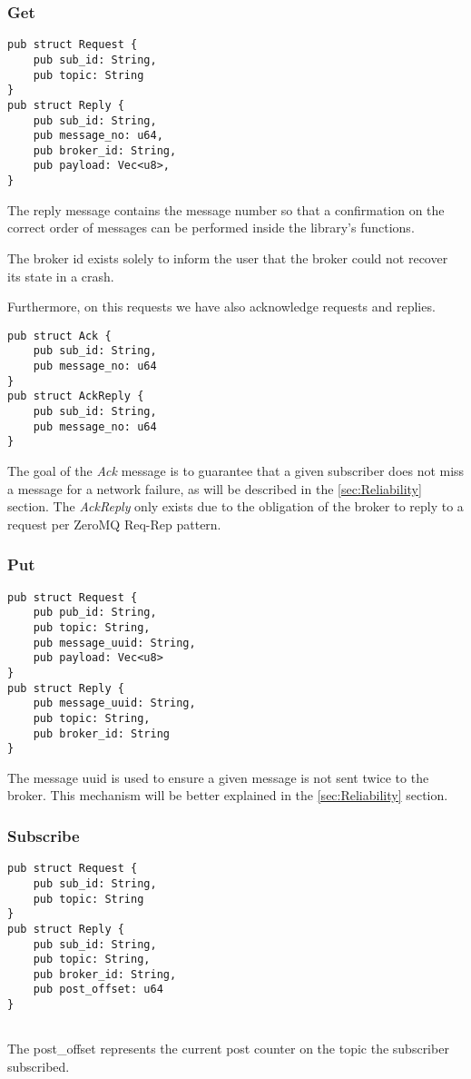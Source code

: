 \subsubsection{Get}

\begin{lstlisting}
pub struct Request {
    pub sub_id: String,
    pub topic: String
}
pub struct Reply {
    pub sub_id: String,
    pub message_no: u64,
    pub broker_id: String,
    pub payload: Vec<u8>,
}
\end{lstlisting}

The reply message contains the message number so that a confirmation on the correct order of messages can be performed inside the library's functions.

The broker id exists solely to inform the user that the broker could not recover its state in a crash.

Furthermore, on this requests we have also acknowledge requests and replies.
\begin{lstlisting}
pub struct Ack {
    pub sub_id: String,
    pub message_no: u64
}
pub struct AckReply {
    pub sub_id: String,
    pub message_no: u64
}
\end{lstlisting}
The goal of the \emph{Ack} message is to guarantee that a given subscriber does not miss a message for a network failure, as will be described in the \ref{sec:Reliability} section. The \emph{AckReply} only exists due to the obligation of the broker to reply to a request per ZeroMQ Req-Rep pattern.


\subsubsection{Put}

\begin{lstlisting}
pub struct Request {
    pub pub_id: String,
    pub topic: String,
    pub message_uuid: String,
    pub payload: Vec<u8>
}
pub struct Reply {
    pub message_uuid: String,
    pub topic: String,
    pub broker_id: String
}
\end{lstlisting}
The message uuid is used to ensure a given message is not sent twice to the broker. This mechanism will be better explained in the \ref{sec:Reliability} section.


\subsubsection{Subscribe}

\begin{lstlisting}
pub struct Request {
    pub sub_id: String,
    pub topic: String
}
pub struct Reply {
    pub sub_id: String,
    pub topic: String,
    pub broker_id: String,
    pub post_offset: u64
}
    
\end{lstlisting}
The post\_offset represents the current post counter on the topic the subscriber subscribed.

